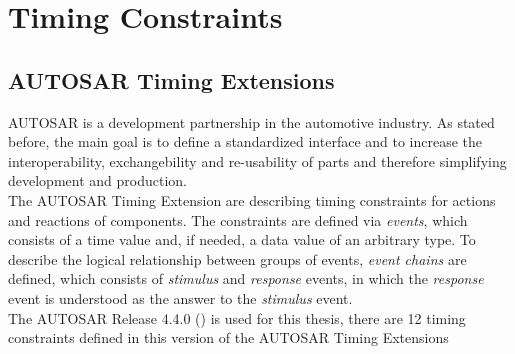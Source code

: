
\chapter{Timing Constraints}
\label{chapter-TimingConstraints}

\section{AUTOSAR Timing Extensions}
	AUTOSAR is a development partnership in the automotive industry. As stated before, the main goal is to define a standardized interface and to increase the interoperability, exchangebility and re-usability of parts and therefore simplifying development and production.\\ %
	The AUTOSAR Timing Extension are describing timing constraints for actions and reactions of components. The constraints are defined via \emph{events}, which consists of a time value and, if needed, a data value of an arbitrary type. To describe the logical relationship between groups of events, \emph{event chains} are defined, which consists of \emph{stimulus} and \emph{response} events, in which the \emph{response} event is understood as the answer to the \emph{stimulus} event.\\
	The AUTOSAR Release 4.4.0 (\cite{TIMEX}) is used for this thesis, there are 12 timing constraints defined in this version of the AUTOSAR Timing Extensions
